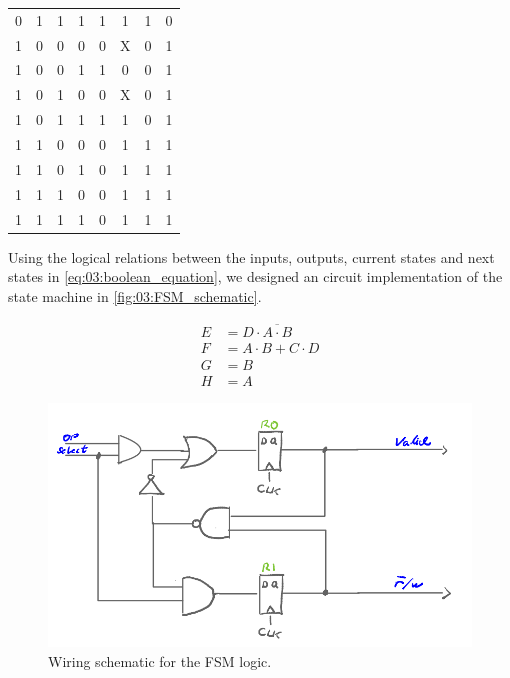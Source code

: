 \begin{table}[H]
\begin{tabular}{|cc|cc|cc|cc|}
        0            & 1            & 1           & 1            & 1              & 1             & 1     & 0                    \\
        1            & 0            & 0           & 0            & 0              & X             & 0     & 1                    \\
        1            & 0            & 0           & 1            & 1              & 0             & 0     & 1                    \\
        1            & 0            & 1           & 0            & 0              & X             & 0     & 1                    \\
        1            & 0            & 1           & 1            & 1              & 1             & 0     & 1                    \\
        1            & 1            & 0           & 0            & 0              & 1             & 1     & 1                    \\
        1            & 1            & 0           & 1            & 0              & 1             & 1     & 1                    \\
        1            & 1            & 1           & 0            & 0              & 1             & 1     & 1                    \\
        1            & 1            & 1           & 1            & 0              & 1             & 1     & 1                    \\ \hline
    \end{tabular}
    \label{tab:03:FSM_truth_table}
\end{table}

Using the logical relations between the inputs, outputs, current states and next states in \autoref{eq:03:boolean_equation}, we designed an circuit implementation of the state machine in \autoref{fig:03:FSM_schematic}.

\begin{equation}
    \begin{split}
        E   &=  D \cdot \overline{A \cdot B}\\
        F   &=  A \cdot B + C \cdot D       \\
        G   &=  B                           \\
        H   &=  A
    \end{split}
    \label{eq:03:boolean_equation}
\end{equation}

\begin{figure}[H]
    \centering
    \includegraphics[width=0.8\linewidth]{LaTeX_2/Figures/fsm_schematic.png}
    \caption{Wiring schematic for the FSM logic.}
    \label{fig:03:FSM_schematic}
\end{figure}